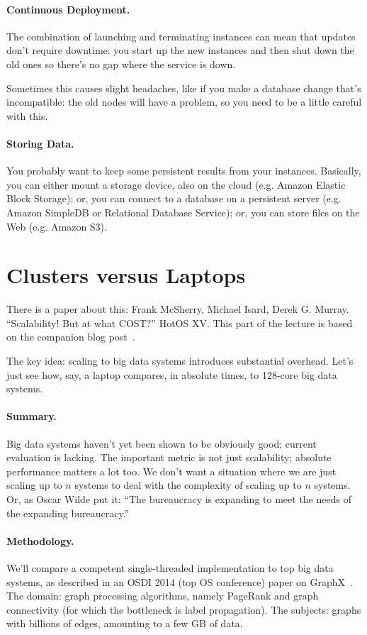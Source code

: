 \documentclass[a4paper]{report}
\begin{document}
\paragraph{Continuous Deployment.} The combination of launching and terminating instances can mean that updates don't require downtime: you start up the new instances and then shut down the old ones so there's no gap where the service is down.

Sometimes this causes slight headaches, like if you make a database change that's incompatible: the old nodes will have a problem, so you need to be a little careful with this.

\paragraph{Storing Data.} You probably want to keep some persistent results
from your instances. Basically, you can either mount a storage device,
also on the cloud (e.g. Amazon Elastic Block Storage); or, you can
connect to a database on a persistent server (e.g. Amazon SimpleDB or
Relational Database Service); or, you can store files on the Web
(e.g. Amazon S3). 


\section*{Clusters versus Laptops}
There is a paper about this: Frank McSherry, Michael Isard, Derek G. Murray. ``Scalability! But at what COST?'' HotOS XV. This part of the lecture is based on the companion blog post~\cite{scalecost}.

The key idea: scaling to big data systems introduces substantial overhead. Let's just see how, say, a laptop compares, in absolute times, to 128-core big data systems.

\paragraph{Summary.} Big data systems haven't yet been shown to be obviously good; current evaluation is lacking.
The important metric is not just scalability; absolute
performance matters a lot too. We don't want a situation where we are just scaling up to $n$ systems to deal with the complexity of scaling up to $n$ systems. Or, as Oscar Wilde put it: ``The bureaucracy is expanding to meet the needs of the expanding bureaucracy.''

\paragraph{Methodology.} We'll compare a competent single-threaded implementation to top
big data systems, as described in an OSDI 2014 (top OS conference) paper on GraphX~\cite{graphx}. The domain: graph processing
algorithms, namely PageRank and graph connectivity (for which the bottleneck is label propagation). The subjects: graphs with billions of edges, amounting to a few
GB of data.
\end{document}
